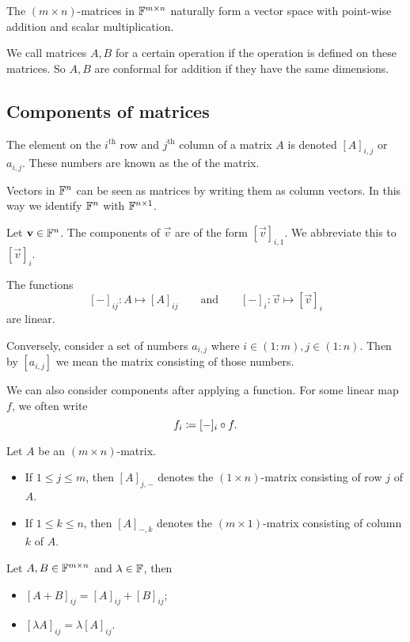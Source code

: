 \begin{lemma}
The $(m\times n)$-matrices in $\mathbb{F}^{m\times n}$ naturally form a vector space with point-wise addition and scalar multiplication. 
\end{lemma}

\begin{definition}
We call matrices $A,B$  for a certain operation if the operation is defined on these matrices. So $A,B$ are conformal for addition if they have the same dimensions. 
\end{definition}

\subsection{Components of matrices}
The element on the $i^\text{th}$ row and $j^\text{th}$ column of a matrix $A$ is denoted $[A]_{i,j}$ or $a_{i,j}$. These numbers are known as the  of the matrix.

Vectors in $\mathbb{F}^n$ can be seen as matrices by writing them as column vectors. In this way we identify $\mathbb{F}^n$ with $\mathbb{F}^{n\times 1}$.

Let $\boldsymbol{\mathrm{v}}\in \mathbb{F}^n$. The components of $\vec{v}$ are of the form $[\vec{v}]_{i,1}$. We abbreviate this to $[\vec{v}]_i$.

\begin{lemma}
The functions
\[ [-]_{ij}: A\mapsto [A]_{ij} \qquad \text{and} \qquad [-]_i: \vec{v}\mapsto [\vec{v}]_i  \]
are linear.
\end{lemma}

Conversely, consider a set of numbers $a_{i,j}$ where $i\in (1:m), j\in (1:n)$. Then by $[a_{i,j}]$ we mean the matrix consisting of those numbers.

We can also consider components after applying a function. For some linear map $f$, we often write
\[ f_i \coloneqq [-]_i\circ f. \]

\begin{definition}
Let $A$ be an $(m\times n)$-matrix.
\begin{itemize}
\item If $1\leq j\leq m$, then $[A]_{j,-}$ denotes the $(1\times n)$-matrix consisting of row $j$ of $A$.
\item If $1\leq k\leq n$, then $[A]_{-,k}$ denotes the $(m\times 1)$-matrix consisting of column $k$ of $A$.
\end{itemize}
\end{definition}

\begin{lemma}
Let $A,B\in \mathbb{F}^{m\times n}$ and $\lambda\in \mathbb{F}$, then
\begin{itemize}
\item $[A+B]_{ij} = [A]_{ij} + [B]_{ij}$;
\item $[\lambda A]_{ij} = \lambda[A]_{ij}$.
\end{itemize}
\end{lemma}

